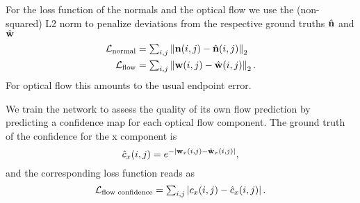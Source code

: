 \documentclass[10pt,twocolumn,letterpaper]{article}
\begin{document}
For the loss function of the normals and the optical flow we use the (non-squared) L2 norm to penalize deviations from the respective ground truths $\hat{\mathbf{n}}$ and $\hat{\mathbf{w}}$
\begin{equation}
\begin{aligned}
\mathcal{L}_\text{normal} &= \textstyle{\sum_{i,j}} \left\Vert \mathbf{n}(i,j) - \hat{\mathbf{n}}(i,j) \right\Vert_2 \\
\mathcal{L}_\text{flow} &= \textstyle{\sum_{i,j}} \left\Vert \mathbf{w}(i,j) - \hat{\mathbf{w}}(i,j) \right\Vert_2.
\end{aligned}
\end{equation}
For optical flow this amounts to the usual endpoint error.




 We train the network to assess the quality of its own flow prediction by predicting a confidence map for each optical flow component.
 The ground truth of the confidence for the x component is 
 \begin{equation}
 \hat{c}_x(i,j) = e^{- \vert\mathbf{w}_x(i,j) - \hat{\mathbf{w}}_x(i,j)\vert},
 \end{equation}
 and the corresponding loss function reads as
 \begin{equation}
 \mathcal{L}_\text{flow confidence} = \textstyle{\sum_{i,j}} \left\vert c_x(i,j) - \hat{c}_x(i,j) \right\vert.
 \end{equation}
\end{document}
